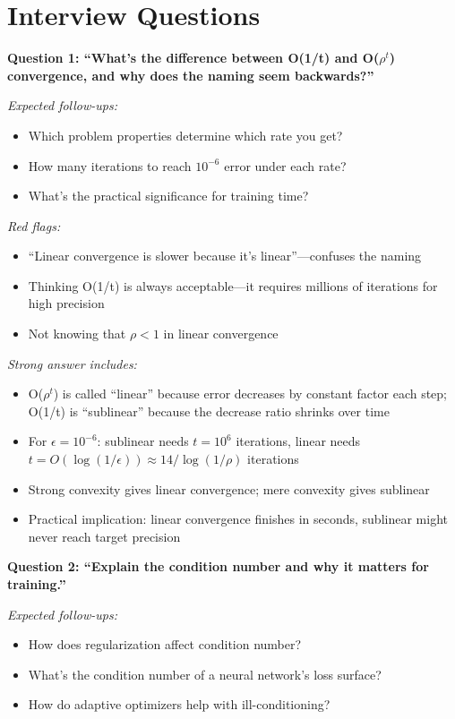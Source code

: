 \documentclass[../../main.tex]{subfiles}
\begin{document}
\section*{Interview Questions}
\begin{interviewquestions}

\textbf{Question 1: ``What's the difference between O(1/t) and O($\rho^t$) convergence, and why does the naming seem backwards?''}

\textit{Expected follow-ups:}
\begin{itemize}
    \item Which problem properties determine which rate you get?
    \item How many iterations to reach $10^{-6}$ error under each rate?
    \item What's the practical significance for training time?
\end{itemize}

\textit{Red flags:}
\begin{itemize}
    \item ``Linear convergence is slower because it's linear''---confuses the naming
    \item Thinking O(1/t) is always acceptable---it requires millions of iterations for high precision
    \item Not knowing that $\rho < 1$ in linear convergence
\end{itemize}

\textit{Strong answer includes:}
\begin{itemize}
    \item O($\rho^t$) is called ``linear'' because error decreases by constant factor each step; O(1/t) is ``sublinear'' because the decrease ratio shrinks over time
    \item For $\epsilon = 10^{-6}$: sublinear needs $t = 10^6$ iterations, linear needs $t = O(\log(1/\epsilon)) \approx 14/\log(1/\rho)$ iterations
    \item Strong convexity gives linear convergence; mere convexity gives sublinear
    \item Practical implication: linear convergence finishes in seconds, sublinear might never reach target precision
\end{itemize}

\textbf{Question 2: ``Explain the condition number and why it matters for training.''}

\textit{Expected follow-ups:}
\begin{itemize}
    \item How does regularization affect condition number?
    \item What's the condition number of a neural network's loss surface?
    \item How do adaptive optimizers help with ill-conditioning?
\end{itemize}


\end{interviewquestions}
\end{document}
